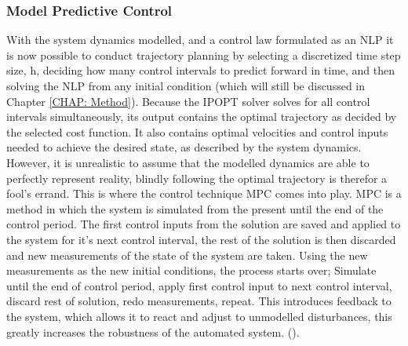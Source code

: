 \subsubsection*{Model Predictive Control}
With the system dynamics modelled, and a control law formulated as an \gls{NLP} it is now possible to conduct trajectory planning by
selecting a discretized time step size, h, deciding how many control intervals to predict forward in time, and then solving the NLP from any initial condition
(which will still be discussed in Chapter \ref{CHAP: Method}). Because the \gls{IPOPT} solver
solves for all control intervals simultaneously, its output contains the optimal trajectory as decided by the selected cost function. It also contains optimal
velocities and control inputs needed to achieve the desired state, as described by the system dynamics. However, it is unrealistic to assume that the
modelled dynamics are able to perfectly represent reality, blindly following the optimal trajectory is therefor a fool's errand. This is where the
control technique \gls{MPC} comes into play. \gls{MPC} is a method in which the system is simulated from the present until the end of the control
period. The first control inputs from the solution are saved and applied to the system for it's next control interval, the rest of the solution is then
discarded and new measurements of the state of the system are taken. Using the new measurements as the new initial conditions, the process starts over;
Simulate until the end of control period, apply first control input to next control interval, discard rest of solution, redo measurements, repeat.
This introduces feedback to the system, which allows it to react and adjust to unmodelled disturbances, this greatly increases the robustness of the automated system.
(\cite{qin1997overview}).%



